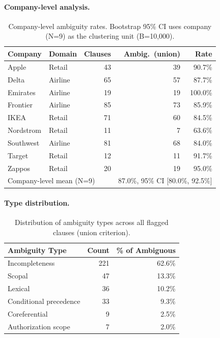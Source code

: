 \paragraph{Company-level analysis.}

\begin{table}[h]
\centering
\small
\begin{tabular}{llrrr}
\toprule
\textbf{Company} & \textbf{Domain} & \textbf{Clauses} & \textbf{Ambig.\ (union)} & \textbf{Rate} \\
\midrule
Apple & Retail & 43 & 39 & 90.7\% \\
Delta & Airline & 65 & 57 & 87.7\% \\
Emirates & Airline & 19 & 19 & 100.0\% \\
Frontier & Airline & 85 & 73 & 85.9\% \\
IKEA & Retail & 71 & 60 & 84.5\% \\
Nordstrom & Retail & 11 & 7 & 63.6\% \\
Southwest & Airline & 81 & 68 & 84.0\% \\
Target & Retail & 12 & 11 & 91.7\% \\
Zappos & Retail & 20 & 19 & 95.0\% \\
\midrule
\multicolumn{3}{l}{Company-level mean (N=9)} & \multicolumn{2}{c}{87.0\%, 95\% CI [80.0\%, 92.5\%]} \\
\bottomrule
\end{tabular}
\caption{Company-level ambiguity rates. Bootstrap 95\% CI uses company (N=9) as the clustering unit (B=10{,}000).}
\label{tab:company_prevalence}
\end{table}

\paragraph{Type distribution.}

\begin{table}[h]
\centering
\small
\begin{tabular}{lrr}
\toprule
\textbf{Ambiguity Type} & \textbf{Count} & \textbf{\% of Ambiguous} \\
\midrule
Incompleteness          & 221 & 62.6\% \\
Scopal                  & 47 & 13.3\% \\
Lexical                 & 36 & 10.2\% \\
Conditional precedence  & 33 & 9.3\% \\
Coreferential           & 9 & 2.5\% \\
Authorization scope     & 7 & 2.0\% \\
\bottomrule
\end{tabular}
\caption{Distribution of ambiguity types across all flagged clauses (union criterion).}
\label{tab:type_distribution}
\end{table}

